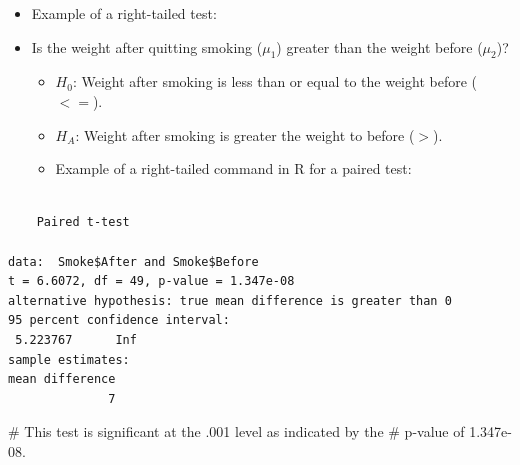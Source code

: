 \documentclass[
  letterpaper,
  DIV=11,
  numbers=noendperiod]{scrreprt}
\newenvironment{Shaded}{\begin{snugshade}}{\end{snugshade}}
\newcommand{\AttributeTok}[1]{\textcolor[rgb]{0.40,0.45,0.13}{#1}}
\newcommand{\CommentTok}[1]{\textcolor[rgb]{0.37,0.37,0.37}{#1}}
\newcommand{\ConstantTok}[1]{\textcolor[rgb]{0.56,0.35,0.01}{#1}}
\newcommand{\FunctionTok}[1]{\textcolor[rgb]{0.28,0.35,0.67}{#1}}
\newcommand{\NormalTok}[1]{\textcolor[rgb]{0.00,0.23,0.31}{#1}}
\newcommand{\SpecialCharTok}[1]{\textcolor[rgb]{0.37,0.37,0.37}{#1}}
\newcommand{\StringTok}[1]{\textcolor[rgb]{0.13,0.47,0.30}{#1}}
\providecommand{\tightlist}{%
  \setlength{\itemsep}{0pt}\setlength{\parskip}{0pt}}\usepackage{longtable,booktabs,array}
\begin{document}
\begin{itemize}
\tightlist
\item
  Example of a right-tailed test:
\item
  Is the weight after quitting smoking (\(\mu_1\)) greater than the
  weight before (\(\mu_2\))?

  \begin{itemize}
  \tightlist
  \item
    \(H_0\): Weight after smoking is less than or equal to the weight
    before (\(<=\)).
  \item
    \(H_A\): Weight after smoking is greater the weight to before
    (\(>\)).
  \item
    Example of a right-tailed command in R for a paired test:
  \end{itemize}
\end{itemize}

\begin{Shaded}
\end{Shaded}

\begin{verbatim}

    Paired t-test

data:  Smoke$After and Smoke$Before
t = 6.6072, df = 49, p-value = 1.347e-08
alternative hypothesis: true mean difference is greater than 0
95 percent confidence interval:
 5.223767      Inf
sample estimates:
mean difference 
              7 
\end{verbatim}

\begin{Shaded}
\begin{Highlighting}[]
\CommentTok{\# This test is significant at the .001 level as indicated by the}
\CommentTok{\# p{-}value of 1.347e{-}08.}
\end{Highlighting}
\end{Shaded}
\end{document}
